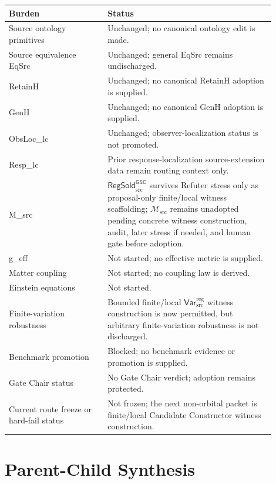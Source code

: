 \documentclass[11pt]{article}
\newcommand{\Msrc}{\mathcal{M}_{\mathrm{src}}}
\newcommand{\RegSold}{\mathsf{RegSold}_{\mathrm{src}}^{\mathsf{GSC}}}
\newcommand{\VarRegSrc}{\mathsf{Var}^{\mathrm{reg}}_{\mathrm{src}}}
\begin{document}
\begin{center}
\begin{tabular}{p{0.33\linewidth}p{0.57\linewidth}}
\hline
Burden & Status \\
\hline
Source ontology primitives & Unchanged; no canonical ontology edit is made. \\
Source equivalence EqSrc & Unchanged; general EqSrc remains undischarged. \\
RetainH & Unchanged; no canonical RetainH adoption is supplied. \\
GenH & Unchanged; no canonical GenH adoption is supplied. \\
ObsLoc\_lc & Unchanged; observer-localization status is not promoted. \\
Resp\_lc & Prior response-localization source-extension data remain routing context only. \\
M\_src & \(\RegSold\) survives Refuter stress only as proposal-only finite/local witness scaffolding; \(\Msrc\) remains unadopted pending concrete witness construction, audit, later stress if needed, and human gate before adoption. \\
g\_eff & Not started; no effective metric is supplied. \\
Matter coupling & Not started; no coupling law is derived. \\
Einstein equations & Not started. \\
Finite-variation robustness & Bounded finite/local \(\VarRegSrc\) witness construction is now permitted, but arbitrary finite-variation robustness is not discharged. \\
Benchmark promotion & Blocked; no benchmark evidence or promotion is supplied. \\
Gate Chair status & No Gate Chair verdict; adoption remains protected. \\
Current route freeze or hard-fail status & Not frozen; the next non-orbital packet is finite/local Candidate Constructor witness construction. \\
\hline
\end{tabular}
\end{center}

\section{Parent-Child Synthesis}
\end{document}
